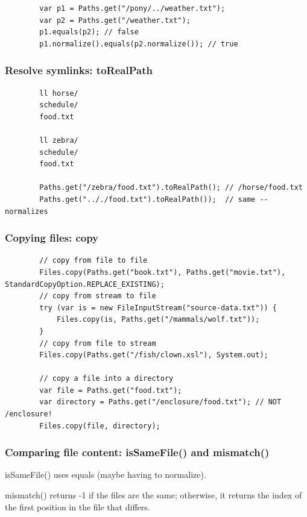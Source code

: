 \documentclass{scrartcl}
\begin{document}
    \begin{lstlisting}
        var p1 = Paths.get("/pony/../weather.txt");
        var p2 = Paths.get("/weather.txt");
        p1.equals(p2); // false
        p1.normalize().equals(p2.normalize()); // true
    \end{lstlisting}

\subsubsection{Resolve symlinks: toRealPath}

    \begin{lstlisting}
        ll horse/
        schedule/
        food.txt

        ll zebra/
        schedule/
        food.txt

        Paths.get("/zebra/food.txt").toRealPath(); // /horse/food.txt
        Paths.get(".././food.txt").toRealPath());  // same -- normalizes
    \end{lstlisting}

\subsubsection{Copying files: copy}

    \begin{lstlisting}
        // copy from file to file
        Files.copy(Paths.get("book.txt"), Paths.get("movie.txt"), StandardCopyOption.REPLACE_EXISTING);
        // copy from stream to file
        try (var is = new FileInputStream("source-data.txt")) {
            Files.copy(is, Paths.get("/mammals/wolf.txt"));
        }
        // copy from file to stream
        Files.copy(Paths.get("/fish/clown.xsl"), System.out);

        // copy a file into a directory
        var file = Paths.get("food.txt");
        var directory = Paths.get("/enclosure/food.txt"); // NOT /enclosure!
        Files.copy(file, directory);
    \end{lstlisting}

\subsubsection{Comparing file content: isSameFile() and mismatch()}
    isSameFile() uses equals (maybe having to normalize).

    mismatch() returns -1 if the files are the same; otherwise, it returns the index of the first position in the file that differs.
\end{document}
